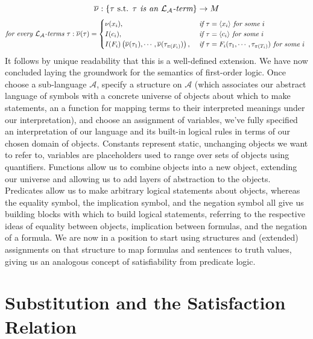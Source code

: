 \documentclass{article}
\begin{document}
    $$ \overline{\nu}: \{ \tau \textnormal{ s.t. } \textit{$ \tau $ is an $ \mathcal{L}_\mathcal{A} $-term} \} \rightarrow M $$
    $$ \textit{for every $ \mathcal{L}_\mathcal{A} $-terms } \tau: \overline{\nu}(\tau) = \begin{cases}
        \nu(x_i), &\textit{ if } \tau = \langle x_i \rangle \textit{ for some $ i $ } \\
        I(c_i), &\textit{ if } \tau = \langle c_i \rangle \textit{ for some $ i $ } \\
        I(F_i) \left(\overline{\nu}(\tau_1), \cdots, \overline{\nu}(\tau_{\pi(F_i)}) \right), &\textit{ if } \tau = F_i(\tau_1, \cdots, \tau_{\pi(T_i)}) \textit{ for some $ i $ }
    \end{cases} $$
\n
It follows by unique readability that this is a well-defined extension. We have now concluded laying the groundwork for the semantics of first-order logic. Once choose a sub-language $ \mathcal{A} $, specify a structure on $ \mathcal{A} $ (which associates our abstract language of symbols with a concrete universe of objects about which to make statements, an a function for mapping terms to their interpreted meanings under our interpretation), and choose an assignment of variables, we've fully specified an interpretation of our language and its built-in logical rules in terms of our chosen domain of objects. Constants represent static, unchanging objects we want to refer to, variables are placeholders used to range over sets of objects using quantifiers. Functions allow us to combine objects into a new object, extending our universe and allowing us to add layers of abstraction to the objects. Predicates allow us to make arbitrary logical statements about objects, whereas the equality symbol, the implication symbol, and the negation symbol all give us building blocks with which to build logical statements, referring to the respective ideas of equality between objects, implication between formulas, and the negation of a formula. We are now in a position to start using structures and (extended) assignments on that structure to map formulas and sentences to truth values, giving us an analogous concept of satisfiability from predicate logic.

\section{Substitution and the Satisfaction Relation}
\end{document}
